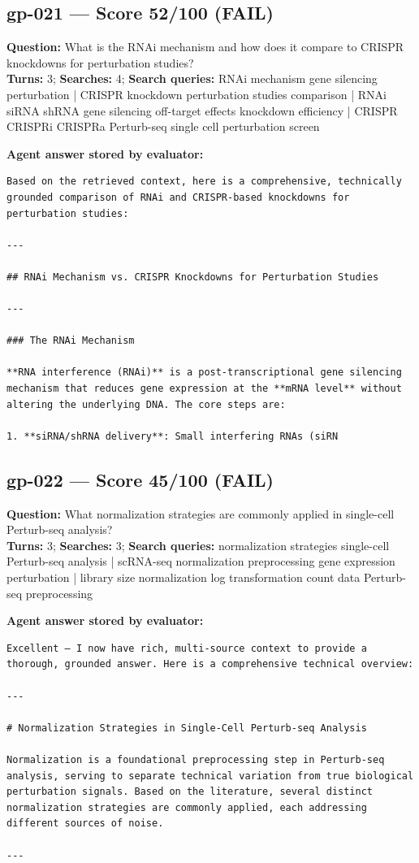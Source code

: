 \documentclass[12pt, a4paper]{article}
\begin{document}
\subsection*{gp-021 --- Score 52/100 (FAIL)}
\noindent\textbf{Question:} What is the RNAi mechanism and how does it compare to CRISPR knockdowns for perturbation studies?\\
\textbf{Turns:} 3; \textbf{Searches:} 4; \textbf{Search queries:} RNAi mechanism gene silencing perturbation | CRISPR knockdown perturbation studies comparison | RNAi siRNA shRNA gene silencing off-target effects knockdown efficiency | CRISPR CRISPRi CRISPRa Perturb-seq single cell perturbation screen

\noindent\textbf{Agent answer stored by evaluator:}
\begin{lstlisting}[numbers=none]
Based on the retrieved context, here is a comprehensive, technically grounded comparison of RNAi and CRISPR-based knockdowns for perturbation studies:

---

## RNAi Mechanism vs. CRISPR Knockdowns for Perturbation Studies

---

### The RNAi Mechanism

**RNA interference (RNAi)** is a post-transcriptional gene silencing mechanism that reduces gene expression at the **mRNA level** without altering the underlying DNA. The core steps are:

1. **siRNA/shRNA delivery**: Small interfering RNAs (siRN
\end{lstlisting}

\subsection*{gp-022 --- Score 45/100 (FAIL)}
\noindent\textbf{Question:} What normalization strategies are commonly applied in single-cell Perturb-seq analysis?\\
\textbf{Turns:} 3; \textbf{Searches:} 3; \textbf{Search queries:} normalization strategies single-cell Perturb-seq analysis | scRNA-seq normalization preprocessing gene expression perturbation | library size normalization log transformation count data Perturb-seq preprocessing

\noindent\textbf{Agent answer stored by evaluator:}
\begin{lstlisting}[numbers=none]
Excellent — I now have rich, multi-source context to provide a thorough, grounded answer. Here is a comprehensive technical overview:

---

# Normalization Strategies in Single-Cell Perturb-seq Analysis

Normalization is a foundational preprocessing step in Perturb-seq analysis, serving to separate technical variation from true biological perturbation signals. Based on the literature, several distinct normalization strategies are commonly applied, each addressing different sources of noise.

---
\end{lstlisting}
\end{document}
